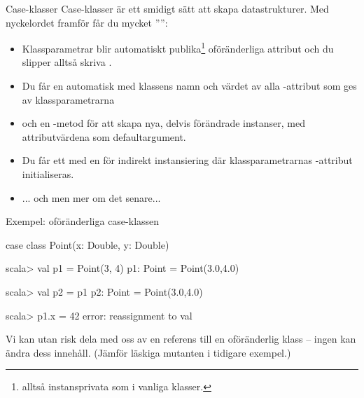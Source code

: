 \begin{Slide}{Case-klasser}\SlideFontSmall
Case-klasser är ett smidigt sätt att skapa  datastrukturer. Med nyckelordet  framför  får du mycket '''':

\begin{itemize}\SlideFontSmall
\item Klassparametrar blir automatiskt publika\footnote{alltså  instansprivata som i vanliga klasser.} oföränderliga attribut och du slipper alltså skriva .
\item Du får en automatisk  med klassens namn och värdet av alla -attribut som ges av klassparametrarna 
\item och en -metod för att skapa nya, delvis förändrade instanser, med attributvärdena som defaultargument.
\item Du får ett   med en   för indirekt instansiering där  klassparametrarnas -attribut initialiseras.
\pause
\item ... och  men mer om det senare...
\end{itemize}
\end{Slide}




\begin{Slide}{Exempel: oföränderliga case-klassen }

\begin{Code}[basicstyle=\SlideFontSize{10}{12}\ttfamily]
case class Point(x: Double, y: Double)
\end{Code}

\begin{REPLnonum}
scala> val p1 = Point(3, 4)
p1: Point = Point(3.0,4.0)

scala> val p2 = p1
p2: Point = Point(3.0,4.0)

scala> p1.x = 42
error: reassignment to val
\end{REPLnonum}
Vi kan utan risk dela med oss av en referens till en oföränderlig klass -- ingen kan ändra dess innehåll. (Jämför läskiga mutanten i tidigare exempel.)

\end{Slide}









